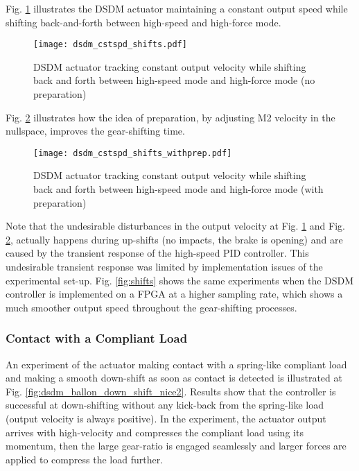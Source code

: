 Fig. \ref{fig:dsdm_cstspd_shifts} illustrates the DSDM actuator maintaining a constant output speed while shifting back-and-forth between high-speed and high-force mode.
%
\begin{figure}[p]
	\centering
		\texttt{[image: dsdm\_cstspd\_shifts.pdf]}
	\caption[DSDM actuator constant velocity gearshifts]{DSDM actuator tracking constant output velocity while shifting back and forth between high-speed mode and high-force mode (no preparation) }
	\label{fig:dsdm_cstspd_shifts}
\end{figure}
%
Fig. \ref{fig:dsdm_cstspd_shifts_withprep} illustrates how the idea of preparation, by adjusting M2 velocity in the nullspace, improves the gear-shifting time. 
%
\begin{figure}[p]
	\centering
		\texttt{[image: dsdm\_cstspd\_shifts\_withprep.pdf]}
	\caption[DSDM actuator constant velocity gearshifts with preparation]{DSDM actuator tracking constant output velocity while shifting back and forth between high-speed mode and high-force mode (with preparation) }
	\label{fig:dsdm_cstspd_shifts_withprep}
\end{figure}
%
Note that the undesirable disturbances in the output velocity at Fig. \ref{fig:dsdm_cstspd_shifts} and Fig. \ref{fig:dsdm_cstspd_shifts_withprep}, actually happens during up-shifts (no impacts, the brake is opening) and are caused by the transient response of the high-speed PID controller. This undesirable transient response was limited by implementation issues of the experimental set-up. Fig. \ref{fig:shifts} shows the same experiments when the DSDM controller is implemented on a FPGA at a higher sampling rate, which shows a much smoother output speed throughout the gear-shifting processes. 
%
%

\newpage

\subsubsection{Contact with a Compliant Load}

An experiment of the actuator making contact with a spring-like compliant load and making a smooth down-shift as soon as contact is detected is illustrated at Fig. \ref{fig:dsdm_ballon_down_shift_nice2}. Results show that the controller is successful at down-shifting without any kick-back from the spring-like load (output velocity is always positive). In the experiment, the actuator output arrives with high-velocity and compresses the compliant load using its momentum, then the large gear-ratio is engaged seamlessly and larger forces are applied to compress the load further. 

